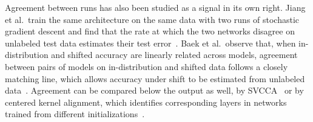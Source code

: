 Agreement between runs has also been studied as a signal in its own
right. Jiang et al.\ train the same architecture on the same data with
two runs of stochastic gradient descent and find that the rate at which
the two networks disagree on unlabeled test data estimates their test
error~\cite{jiang2022assessing}.
Baek et al.\ observe that, when in-distribution and shifted accuracy are
linearly related across models, agreement between pairs of models on
in-distribution and shifted data follows a closely matching line, which
allows accuracy under shift to be estimated from unlabeled
data~\cite{baek2022agreement}.
Agreement can be compared below the output as well, by
SVCCA~\cite{raghu2017svcca} or by centered kernel alignment, which
identifies corresponding layers in networks trained from different
initializations~\cite{kornblith2019similarity}.

